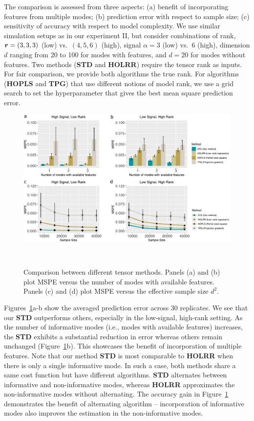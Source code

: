 \documentclass[12pt]{article}
\theoremstyle{definition}
\theoremstyle{definition}
\begin{document}
The comparison is assessed from three aspects: (a) benefit of incorporating features from multiple modes; (b) prediction error with respect to sample size; (c) sensitivity of accuracy with respect to model complexity. We use similar simulation setups as in our experiment II, but consider combinations of rank, $\bm{r}=(3,3,3)$ (low) vs.\ $(4,5,6)$ (high), signal $\alpha = 3$ (low) vs.\ $6$ (high), dimension $d$ ranging from 20 to 100 for modes with features, and $d = 20$ for modes without features. Two methods ({\bf STD} and {\bf HOLRR}) require the tensor rank as inputs. For fair comparison, we provide both algorithms the true rank. For algorithms ({\bf HOPLS} and {\bf TPG}) that use different notions of model rank, we use a grid search to set the hyperparameter that gives the best mean square prediction error.

\begin{figure}[ht]
\centering
\includegraphics[width=15cm]{compare_alternative.pdf} 
\caption{Comparison between different tensor methods. Panels (a) and (b) plot MSPE versus the number of modes with available features. Panels (c) and (d) plot MSPE versus the effective sample size $d^2$.}~\label{fig:compare}
\vspace{-.4cm}
\end{figure}

Figures~\ref{fig:compare}a-b show the averaged prediction error across 30 replicates. We see that our {\bf STD} outperforms others, especially in the low-signal, high-rank setting. As the number of informative modes (i.e., modes with available features) increases, the {\bf STD} exhibits a substantial reduction in error whereas others remain unchanged (Figure~\ref{fig:compare}b). This showcases the benefit of incorporation of multiple features. Note that our method {\bf STD} is most comparable to {\bf HOLRR} when there is only a single informative mode. In such a case, both methods share a same cost function but have different algorithms. {\bf STD} alternates between informative and non-informative modes, whereas {\bf HOLRR} approximates the non-informative modes without alternating. The accuracy gain in Figure~\ref{fig:compare} demonstrates the benefit of alternating algorithm -- incorporation of informative modes also improves the estimation in the non-informative modes. 
\end{document}
